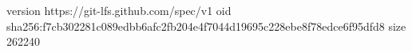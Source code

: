 version https://git-lfs.github.com/spec/v1
oid sha256:f7cb302281c089edbb6afc2fb204e4f7044d19695c228ebe8f78edce6f95dfd8
size 262240
